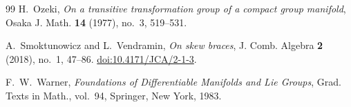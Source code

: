 \documentclass[reqno]{amsart}
\begin{document}
\begin{thebibliography}{99}
H.~Ozeki,
\emph{On a transitive transformation group of a compact group manifold},
Osaka J. Math. \textbf{14} (1977), no.~3, 519--531.



A.~Smoktunowicz and L.~Vendramin,
\emph{On skew braces},
J. Comb. Algebra \textbf{2} (2018), no.~1, 47--86.
\href{https://doi.org/10.4171/JCA/2-1-3}{doi:10.4171/JCA/2-1-3}.


F.~W.~Warner,
\emph{Foundations of Differentiable Manifolds and Lie Groups},
Grad. Texts in Math., vol.~94, Springer, New York, 1983.

\end{thebibliography}
\end{document}
